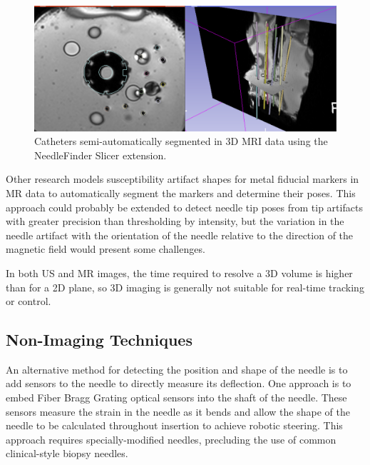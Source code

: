 \begin{figure}[h]
\includegraphics[width=1.0\textwidth]{Fig/chap2/needlefinder.png}
\caption{Catheters semi-automatically segmented in 3D MRI data using the NeedleFinder Slicer extension\cite{pernelle_validation_2013}.}
\label{fig:needlefinder}
\end{figure}

Other research models susceptibility artifact shapes for metal fiducial markers in MR data to automatically segment the markers and determine their poses\cite{zijlstra_fast_2017}. This approach could probably be extended to detect needle tip poses from tip artifacts with greater precision than thresholding by intensity, but the variation in the needle artifact with the orientation of the needle relative to the direction of the magnetic field would present some challenges.

In both US and MR images, the time required to resolve a 3D volume is higher than for a 2D plane, so 3D imaging is generally not suitable for real-time tracking or control.

\subsection{Non-Imaging Techniques}
An alternative method for detecting the position and shape of the needle is to add sensors to the needle to directly measure its deflection. One approach is to embed Fiber Bragg Grating optical sensors into the shaft of the needle\cite{roesthuis_three-dimensional_2014}. These sensors measure the strain in the needle as it bends and allow the shape of the needle to be calculated throughout insertion to achieve robotic steering. This approach requires specially-modified needles, precluding the use of common clinical-style biopsy needles.

